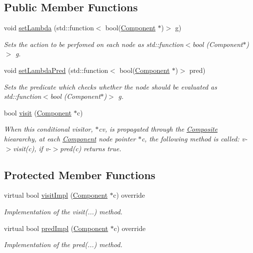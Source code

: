 \subsection*{Public Member Functions}
\begin{DoxyCompactItemize}
\item 
void \hyperlink{classVisitorLambda_a77004dd1388b4b7ebc5d1d6fe1adb747}{set\+Lambda} (std\+::function$<$ bool(\hyperlink{classComponent}{Component} $\ast$)$>$ g)
\begin{DoxyCompactList}\small\item\em Sets the action to be perfomed on each node as std\+::function$<$bool (\+Component$\ast$)$>$ g. \end{DoxyCompactList}\item 
void \hyperlink{classVisitorLambda_a46d9cc856e3fbc7155dd2212981a8902}{set\+Lambda\+Pred} (std\+::function$<$ bool(\hyperlink{classComponent}{Component} $\ast$)$>$ pred)
\begin{DoxyCompactList}\small\item\em Sets the predicate which checks whether the node should be evaluated as std\+::function$<$bool (\+Component$\ast$)$>$ g. \end{DoxyCompactList}\item 
bool \hyperlink{classVisitor_a3f8ea7ad6aa61e99d8d1bc0576bdf23c}{visit} (\hyperlink{classComponent}{Component} $\ast$c)
\begin{DoxyCompactList}\small\item\em When this conditional visitor, $\ast$cv, is propagated through the \hyperlink{classComposite}{Composite} hieararchy, at each \hyperlink{classComponent}{Component} node pointer $\ast$c, the following method is called\+: v-\/$>$visit(c), if v-\/$>$pred(c) returns true. \end{DoxyCompactList}\end{DoxyCompactItemize}
\subsection*{Protected Member Functions}
\begin{DoxyCompactItemize}
\item 
virtual bool \hyperlink{classVisitorLambda_af934df1d8669dd315d824d9ee706f250}{visit\+Impl} (\hyperlink{classComponent}{Component} $\ast$c) override
\begin{DoxyCompactList}\small\item\em Implementation of the visit(...) method. \end{DoxyCompactList}\item 
virtual bool \hyperlink{classVisitorLambda_ad41ffd99799d4ce452e5a9aaf6b62d46}{pred\+Impl} (\hyperlink{classComponent}{Component} $\ast$c) override
\begin{DoxyCompactList}\small\item\em Implementation of the pred(...) method. \end{DoxyCompactList}\end{DoxyCompactItemize}
